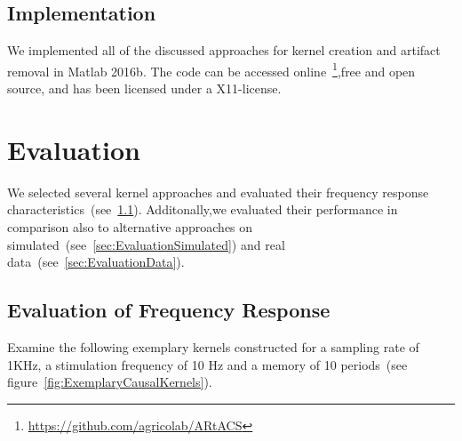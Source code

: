 \documentclass[a4paper]{article}
\newcommand{\figref}[1]{(see figure~\ref{#1})}
\begin{document}
\subsection{Implementation}

We implemented all of the discussed approaches for kernel creation and artifact removal in Matlab 2016b. The code can be accessed online~\footnote{\url{https://github.com/agricolab/ARtACS}},free and open source, and has been licensed under a X11-license.

\section{Evaluation}
We selected several kernel approaches and evaluated their frequency response characteristics~(see~\ref{sec:EvaluationFreq}). Additonally,we evaluated their performance in comparison also to alternative approaches on simulated~(see~\ref{sec:EvaluationSimulated}) and real data~(see~\ref{sec:EvaluationData}).

\subsection{Evaluation of Frequency Response}\label{sec:EvaluationFreq}

Examine the following exemplary kernels constructed for a sampling rate of 1KHz, a stimulation frequency of 10 Hz and a memory of 10 periods~\figref{fig:ExemplaryCausalKernels}.
\end{document}
